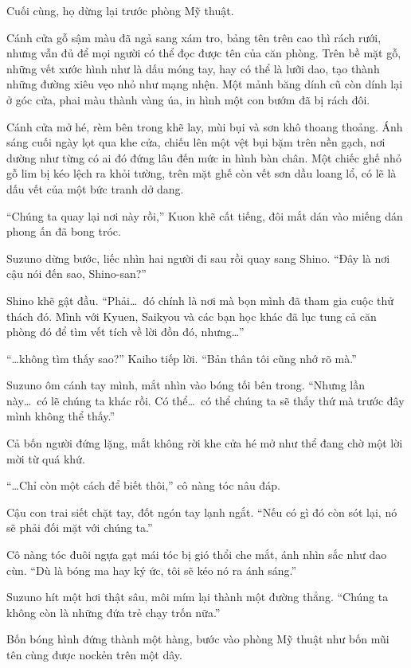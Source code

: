 \documentclass[../main.tex]{subfiles}
\begin{document}
\ct

Cuối cùng, họ dừng lại trước phòng Mỹ thuật.

Cánh cửa gỗ sậm màu đã ngả sang xám tro, bảng tên trên cao thì rách rưới, nhưng vẫn đủ để mọi người có thể đọc được tên của căn phòng. Trên bề mặt gỗ, những vết xước hình như là dấu móng tay, hay có thể là lưỡi dao, tạo thành những đường xiêu vẹo nhỏ như mạng nhện. Một mảnh băng dính cũ còn dính lại ở góc cửa, phai màu thành vàng úa, in hình một con bướm đã bị rách đôi.

Cánh cửa mở hé, rèm bên trong khẽ lay, mùi bụi và sơn khô thoang thoảng. Ánh sáng cuối ngày lọt qua khe cửa, chiếu lên một vệt bụi bặm trên nền gạch, nơi dường như từng có ai đó đứng lâu đến mức in hình bàn chân. Một chiếc ghế nhỏ gỗ lim bị kéo lệch ra khỏi tường, trên mặt ghế còn vết sơn dầu loang lổ, có lẽ là dấu vết của một bức tranh dở dang.

``Chúng ta quay lại nơi này rồi,'' Kuon khẽ cất tiếng, đôi mắt dán vào miếng dán phong ấn đã bong tróc.

Suzuno dừng bước, liếc nhìn hai người đi sau rồi quay sang Shino. ``Đây là nơi cậu nói đến sao, Shino-san?''

Shino khẽ gật đầu. ``Phải\dots\ đó chính là nơi mà bọn mình đã tham gia cuộc thử thách đó. Mình với Kyuen, Saikyou và các bạn học khác đã lục tung cả căn phòng đó để tìm vết tích về lời đồn đó, nhưng\dots''

``\dots không tìm thấy sao?'' Kaiho tiếp lời. ``Bản thân tôi cũng nhớ rõ mà.''

Suzuno ôm cánh tay mình, mắt nhìn vào bóng tối bên trong. ``Nhưng lần này\dots\ có lẽ chúng ta khác rồi. Có thể\dots\ có thể chúng ta sẽ thấy thứ mà trước đây mình không thể thấy.''

Cả bốn người đứng lặng, mắt không rời khe cửa hé mở như thể đang chờ một lời mời từ quá khứ.

``\dots Chỉ còn một cách để biết thôi,'' cô nàng tóc nâu đáp.

Cậu con trai siết chặt tay, đốt ngón tay lạnh ngắt. ``Nếu có gì đó còn sót lại, nó sẽ phải đối mặt với chúng ta.''

Cô nàng tóc đuôi ngựa gạt mái tóc bị gió thổi che mắt, ánh nhìn sắc như dao cùn. ``Dù là bóng ma hay ký ức, tôi sẽ kéo nó ra ánh sáng.''

Suzuno hít một hơi thật sâu, môi mím lại thành một đường thẳng. ``Chúng ta không còn là những đứa trẻ chạy trốn nữa.''

Bốn bóng hình đứng thành một hàng, bước vào phòng Mỹ thuật như bốn mũi tên cùng được nockẻn trên một dây.
\end{document}
